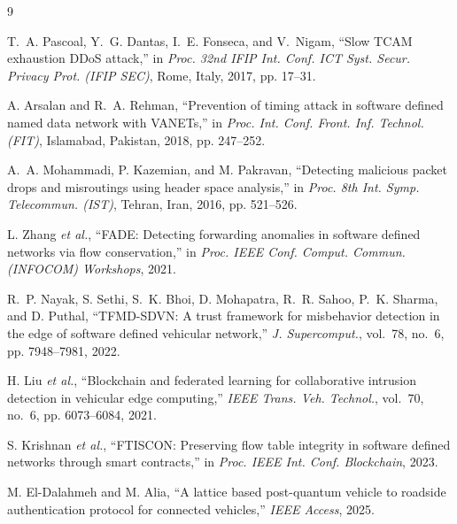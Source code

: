 \documentclass[lettersize,journal]{IEEEtran}
\theoremstyle{plain}
\theoremstyle{remark}
\begin{document}
	\begin{thebibliography}{9}
		
		
		T.~A. Pascoal, Y.~G. Dantas, I.~E. Fonseca, and V.~Nigam, ``Slow TCAM exhaustion DDoS attack,'' in \emph{Proc. 32nd IFIP Int. Conf. ICT Syst. Secur. Privacy Prot. (IFIP SEC)}, Rome, Italy, 2017, pp. 17--31.
		
		A. Arsalan and R.~A. Rehman, ``Prevention of timing attack in software defined named data network with VANETs,'' in \emph{Proc. Int. Conf. Front. Inf. Technol. (FIT)}, Islamabad, Pakistan, 2018, pp. 247--252.
		
		A.~A. Mohammadi, P. Kazemian, and M. Pakravan, ``Detecting malicious packet drops and misroutings using header space analysis,'' in \emph{Proc. 8th Int. Symp. Telecommun. (IST)}, Tehran, Iran, 2016, pp. 521--526.
		
		L. Zhang \emph{et al.}, ``FADE: Detecting forwarding anomalies in software defined networks via flow conservation,'' in \emph{Proc. IEEE Conf. Comput. Commun. (INFOCOM) Workshops}, 2021.
		
		R.~P. Nayak, S. Sethi, S.~K. Bhoi, D. Mohapatra, R.~R. Sahoo, P.~K. Sharma, and D. Puthal, ``TFMD-SDVN: A trust framework for misbehavior detection in the edge of software defined vehicular network,'' \emph{J. Supercomput.}, vol.~78, no.~6, pp. 7948--7981, 2022.
		
		H. Liu \emph{et al.}, ``Blockchain and federated learning for collaborative intrusion detection in vehicular edge computing,'' \emph{IEEE Trans. Veh. Technol.}, vol.~70, no.~6, pp. 6073--6084, 2021.
		
		S. Krishnan \emph{et al.}, ``FTISCON: Preserving flow table integrity in software defined networks through smart contracts,'' in \emph{Proc. IEEE Int. Conf. Blockchain}, 2023.
		
		M. El-Dalahmeh and M. Alia, ``A lattice based post-quantum vehicle to roadside authentication protocol for connected vehicles,'' \emph{IEEE Access}, 2025.
		
		
	\end{thebibliography}
	
\end{document}

